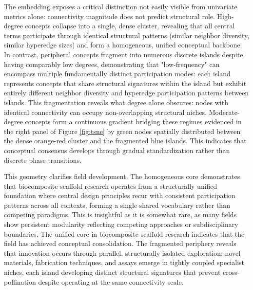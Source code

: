 \documentclass{article}
\begin{document}
The embedding exposes a critical distinction not easily visible from univariate metrics alone: connectivity magnitude does not predict structural role. High-degree concepts collapse into a single, dense cluster, revealing that all central terms participate through identical structural patterns (similar neighbor diversity, similar hyperedge sizes) and form a homogeneous, unified conceptual backbone. In contrast, peripheral concepts fragment into numerous discrete islands despite having comparably low degrees, demonstrating that "low-frequency" can encompass multiple fundamentally distinct participation modes: each island represents concepts that share structural signatures within the island but exhibit entirely different neighbor diversity and hyperedge participation patterns between islands. This fragmentation reveals what degree alone obscures: nodes with identical connectivity can occupy non-overlapping structural niches. Moderate-degree concepts form a continuous gradient bridging these regimes evidenced in the right panel of Figure \ref{fig:tsne} by green nodes spatially distributed between the dense orange-red cluster and the fragmented blue islands. This indicates that conceptual consensus develops through gradual standardization rather than discrete phase transitions.

This geometry clarifies field development. The homogeneous core demonstrates that biocomposite scaffold research operates from a structurally unified foundation where central design principles recur with consistent participation patterns across all contexts, forming a single shared vocabulary rather than competing paradigms. This is insightful as it is somewhat rare, as many fields show persistent modularity reflecting competing approaches or subdisciplinary boundaries. The unified core in biocomposite scaffold research indicates that the field has achieved conceptual consolidation. The fragmented periphery reveals that innovation occurs through parallel, structurally isolated exploration: novel materials, fabrication techniques, and assays emerge in tightly coupled specialist niches, each island developing distinct structural signatures that prevent cross-pollination despite operating at the same connectivity scale. 
\end{document}
